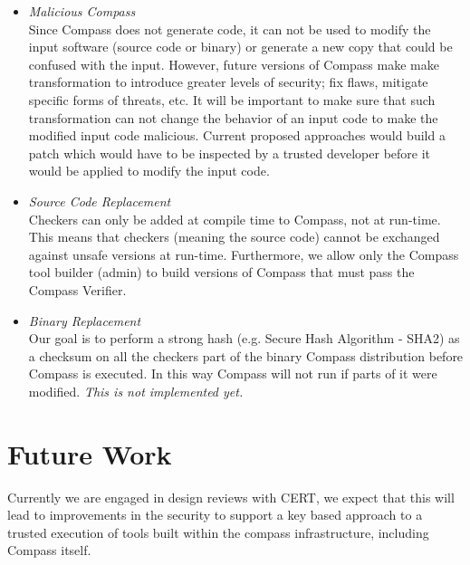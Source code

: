 \begin{itemize}
\item \emph{Malicious Compass} \\
    Since Compass does not generate code, it can not be used to modify the input software
    (source code or binary) or generate a new copy that could be confused with the input.
    However, future versions of Compass make make transformation to introduce greater
    levels of security; fix flaws, mitigate specific forms of threats, etc.  It will be
    important to make sure that such transformation can not change the behavior of an
    input code to make the modified input code malicious.  Current proposed approaches
    would build a patch which would have to be inspected by a trusted developer before
    it would be applied to modify the input code.

\item \emph{Source Code Replacement} \\ Checkers can only be added at compile time to
    Compass, not at run-time. This means that checkers (meaning the source code) cannot be
    exchanged against unsafe versions at run-time. Furthermore, we allow only the Compass
    tool builder (admin) to build versions of Compass that must pass the Compass Verifier.

\item \emph{Binary Replacement} \\ 
    Our goal is to perform a strong hash (e.g. Secure Hash Algorithm - SHA2) as a 
    checksum on all the checkers
    part of the binary Compass distribution before Compass is executed. In this way
    Compass will not run if parts of it were modified. {\em This is not implemented yet.}

\end{itemize} 




\section{Future Work}

    Currently we are engaged in design reviews with CERT, we expect that this will lead to 
improvements in the security to support a key based approach to a trusted execution of
tools built within the compass infrastructure, including Compass itself.

